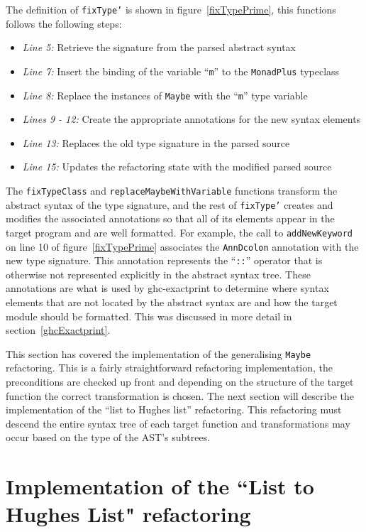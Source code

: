 The definition of \texttt{fixType'} is shown in figure~\ref{fixTypePrime}, this functions follows the following steps:

\begin{itemize}
\item \textit{Line 5:} Retrieve the signature from the parsed abstract syntax
\item \textit{Line 7:} Insert the binding of the variable ``\texttt{m}'' to the \texttt{MonadPlus} typeclass
\item \textit{Line 8:} Replace the instances of \texttt{Maybe} with the ``\texttt{m}'' type variable
\item \textit{Lines 9 - 12:} Create the appropriate annotations for the new syntax elements
\item \textit{Line 13:} Replaces the old type signature in the parsed source
\item \textit{Line 15:} Updates the refactoring state with the modified parsed source
\end{itemize}

The \texttt{fixTypeClass} and \texttt{replaceMaybeWithVariable} functions transform the abstract syntax of the type signature, and the rest of \texttt{fixType'} creates and modifies the associated annotations so that all of its elements appear in the target program and are well formatted. For example, the call to \texttt{addNewKeyword} on line 10 of figure~\ref{fixTypePrime} associates the \texttt{AnnDcolon} annotation with the new type signature. This annotation represents the ``\texttt{::}'' operator that is otherwise not represented explicitly in the abstract syntax tree. These annotations are what is used by ghc-exactprint to determine where syntax elements that are not located by the abstract syntax are and how the target module should be formatted. This was discussed in more detail in section~\ref{ghcExactprint}.

This section has covered the implementation of the generalising \texttt{Maybe} refactoring. This is a fairly straightforward refactoring implementation, the preconditions are checked up front and depending on the structure of the target function the correct transformation is chosen. The next section will describe the implementation of the ``list to Hughes list'' refactoring. This refactoring must descend the entire syntax tree of each target function and transformations may occur based on the type of the AST's subtrees.  

\section{Implementation of the ``List to Hughes List" refactoring}
\label{sec:hughesListImp}

